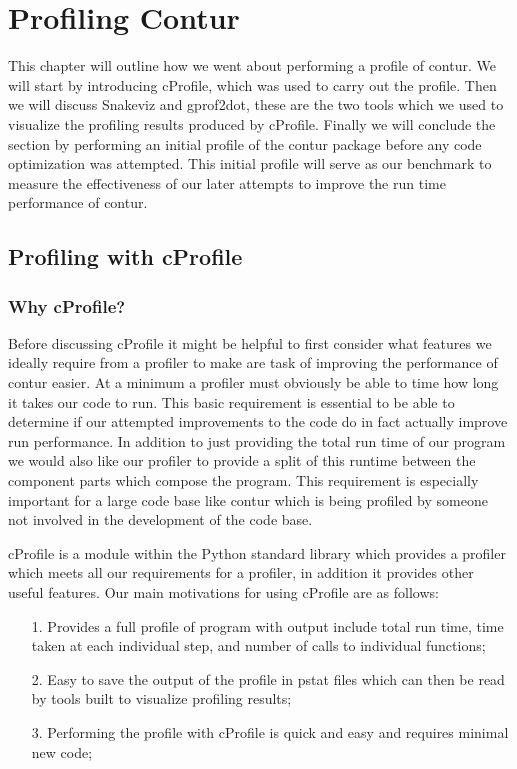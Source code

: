 \chapter{Profiling Contur}
\label{chapterlabel3}

This chapter will outline how we went about performing a profile of contur. We will start by introducing cProfile, which was used to carry out the profile. Then we will discuss Snakeviz and gprof2dot, these are the two tools which we used to visualize the profiling results produced by cProfile. Finally we will conclude the section by performing an initial profile of the contur package before any code optimization was attempted. This initial profile will serve as our benchmark to measure the effectiveness of our later attempts to improve the run time performance of contur.

\section{Profiling with cProfile}

\subsection{Why cProfile?}
Before discussing cProfile it might be helpful to first consider what features we ideally require from a profiler to make are task of improving the performance of contur easier. At a minimum a profiler must obviously be able to time how long it takes our code to run. This basic requirement is essential to be able to determine if our attempted improvements to the code do in fact actually improve run performance. In addition to just providing the total run time of our program we would also like our profiler to provide a split of this runtime between the component parts which compose the program. This requirement is especially important for a large code base like contur which is being profiled by someone not involved in the development of the code base.

cProfile is a module within the Python standard library which provides a profiler which meets all our requirements for a profiler, in addition it provides other useful features. Our main motivations for using cProfile are as follows:

\begin{itemize}
\item[1.] Provides a full profile of program with output include total run time, time taken at each individual step, and number of calls to individual functions;
\item[2.] Easy to save the output of the profile in pstat files which can then be read by tools built to visualize profiling results;
\item[3.] Performing the profile with cProfile is quick and easy and requires minimal new code;
\end{itemize}

